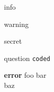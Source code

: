 \begin{Information}
info
\end{Information}
\begin{Warning}
warning
\end{Warning}
\begin{FooBar}
secret
\end{FooBar}
\begin{Question}
question \texttt{coded}
\end{Question}
\begin{Error}
\textbf{error}
foo bar \\
baz
\end{Error}
